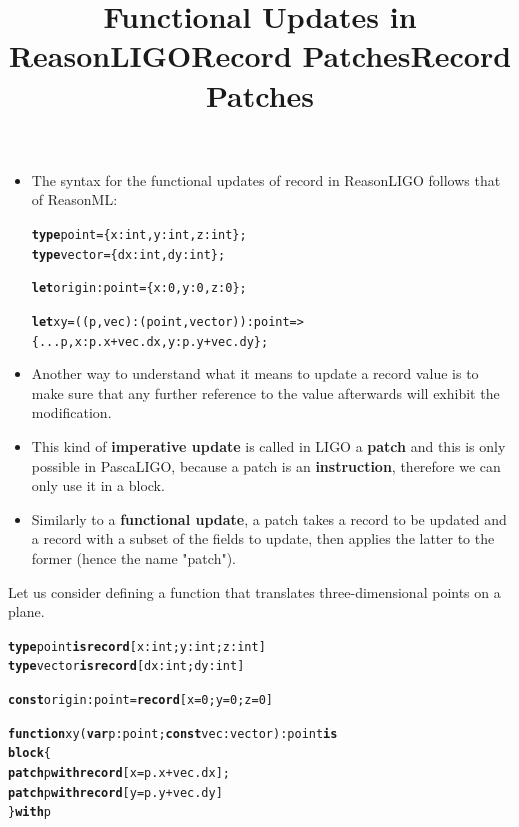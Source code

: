 \documentclass[wide]{slides}
\newcommand{\Kblock}[0]{\textbf{block}\xspace}
\newcommand{\Kconst}[0]{\textbf{const}\xspace}
\newcommand{\Kfunction}[0]{\textbf{function}\xspace}
\newcommand{\Kis}[0]{\textbf{is}\xspace}
\newcommand{\Kpatch}[0]{\textbf{patch}\xspace}
\newcommand{\Krecord}[0]{\textbf{record}\xspace}
\newcommand{\Ktype}[0]{\textbf{type}\xspace}
\newcommand{\Kvar}[0]{\textbf{var}\xspace}
\newcommand{\Kwith}[0]{\textbf{with}\xspace}
\newcommand{\Klet}[0]{\textbf{let}\xspace}
\begin{document}
\begin{slide}
  \title{Functional Updates in ReasonLIGO}

  \begin{itemize}

    \item The syntax for the functional updates of record in
      ReasonLIGO follows that of ReasonML:
      \begin{alltt}
\Ktype point = \{x : int, y : int, z : int\};
\Ktype vector = \{dx : int, dy : int\};

\Klet origin : point = \{x : 0, y : 0, z : 0\};

\Klet xy = ((p, vec) : (point, vector)) : point =>
  \{...p, x : p.x + vec.dx, y : p.y + vec.dy\};
      \end{alltt}

  \end{itemize}

\end{slide}

\begin{slide}
  \title{Record Patches}

  \begin{itemize}

    \item Another way to understand what it means to update a record
      value is to make sure that any further reference to the value
      afterwards will exhibit the modification.

    \item This kind of \textbf{imperative update} is called in LIGO a
      \textbf{patch} and this is only possible in PascaLIGO, because a
      patch is an \textbf{instruction}, therefore we can only use it
      in a block.

    \item Similarly to a \textbf{functional update}, a patch takes a
      record to be updated and a record with a subset of the fields to
      update, then applies the latter to the former (hence the name
      "patch").

  \end{itemize}

\end{slide}

\begin{slide}
  \title{Record Patches}

    Let us consider defining a function that translates
    three-dimensional points on a plane.
      \begin{alltt}
\Ktype point \Kis \Krecord [x : int; y : int; z : int]
\Ktype vector \Kis \Krecord [dx : int; dy : int]

\Kconst origin : point = \Krecord [x = 0; y = 0; z = 0]

\Kfunction xy (\Kvar p : point; \Kconst vec : vector) : point \Kis
  \Kblock \{
    \Kpatch p \Kwith \Krecord [x = p.x + vec.dx];
    \Kpatch p \Kwith \Krecord [y = p.y + vec.dy]
  \} \Kwith p
      \end{alltt}

\end{slide}
\end{document}
